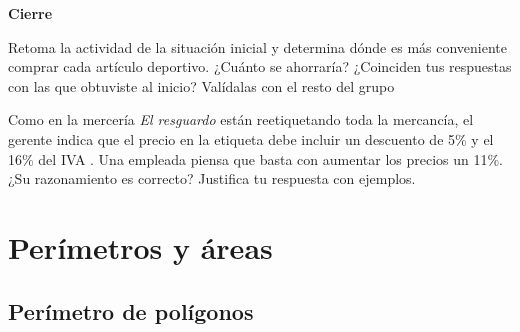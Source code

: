 \documentclass[11pt]{book}
\begin{document}
\begin{boxK}
  \begin{center}\textbf{Cierre}\end{center}

  Retoma la actividad de la situación inicial y determina dónde es más conveniente
  comprar cada artículo deportivo. ¿Cuánto se ahorraría? ¿Coinciden tus
  respuestas con las que obtuviste al inicio? Valídalas con el resto del grupo
\end{boxK}

\begin{boxH}
  Como en la mercería \emph{El resguardo} están reetiquetando toda la mercancía, el gerente
  indica que el precio en la etiqueta debe incluir un descuento de 5\% y el 16\%
  del IVA . Una empleada piensa que basta con aumentar los precios un 11\%. ¿Su razonamiento
  es correcto? Justifica tu respuesta con ejemplos.
\end{boxH}



\newpage \thispagestyle{plain}
\section{Perímetros y áreas}

\subsection{Perímetro de polígonos}
\end{document}
